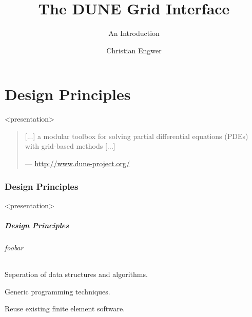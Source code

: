\documentclass[aspectratio=169,11pt]{beamer}
\title{The DUNE Grid Interface}
\subtitle{An Introduction}
\author{Christian Engwer}
\institute[]
{
  Applied Mathematics\\WWU Münster\\
}
\theoremstyle{definition}
\begin{document}


\part{Design Principles}

\begin{onlyenv}<presentation>
\begin{frame}
   \partpage
   \pause
  \begin{quote}
    {\normalfont{}[...]} a modular toolbox for solving partial
    differential equations (PDEs) with grid-based
    methods {\normalfont{}[...]}

    \hfill--- {\normalfont \url{http://www.dune-project.org/}}
  \end{quote}
 \end{frame}
\end{onlyenv}

\section{Design Principles}

\begin{onlyenv}<presentation>
  \begin{frame} \frametitle{Design Principles}

    \framesubtitle{foobar}
    \begin{description}
    \item[Flexibility:]
      {Seperation of data structures and algorithms.}\\[2ex]
    \item[Efficiency:]
      {Generic programming techniques.}\\[2ex]
    \item[Legacy Code:]
      {Reuse existing finite element software.}\\[2ex]
    \end{description}

  \end{frame}
\end{onlyenv}
\end{document}
